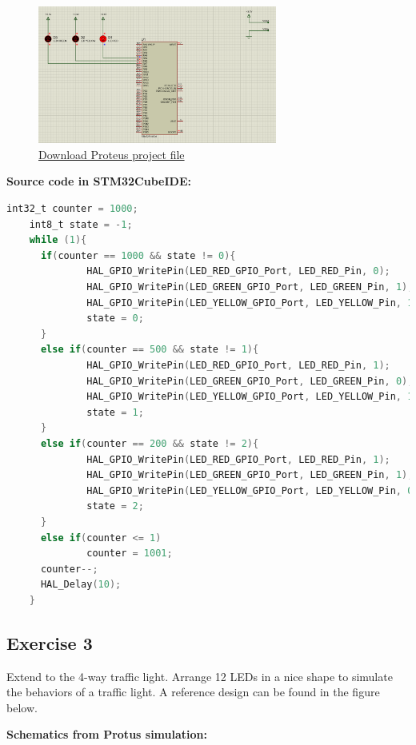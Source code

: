 \documentclass[twoside, final]{hcmut_report}
\begin{document}
\begin{figure}[ht]
    \centering
    \includegraphics[width=0.7\textwidth]{graphics/f3.png}
    \caption{
        \href{https://github.com/batmaon512/Microcontroller-251/blob/main/Lab/Lab1_LED_Animations/Source_Proteus/EX2.pdsprj}{Download Proteus project file}
    }

\end{figure}

\textbf{Source code in STM32CubeIDE:}
\begin{lstlisting}[language=C, caption=Source code for Exercise 2, label=lst:ex2]
    int32_t counter = 1000;
    int8_t state = -1;
    while (1){
      if(counter == 1000 && state != 0){
	  		  HAL_GPIO_WritePin(LED_RED_GPIO_Port, LED_RED_Pin, 0);
	  		  HAL_GPIO_WritePin(LED_GREEN_GPIO_Port, LED_GREEN_Pin, 1);
	  		  HAL_GPIO_WritePin(LED_YELLOW_GPIO_Port, LED_YELLOW_Pin, 1);
	  		  state = 0;
	  }
	  else if(counter == 500 && state != 1){
	  		  HAL_GPIO_WritePin(LED_RED_GPIO_Port, LED_RED_Pin, 1);
	  		  HAL_GPIO_WritePin(LED_GREEN_GPIO_Port, LED_GREEN_Pin, 0);
	  		  HAL_GPIO_WritePin(LED_YELLOW_GPIO_Port, LED_YELLOW_Pin, 1);
	  		  state = 1;
	  }
	  else if(counter == 200 && state != 2){
  		  	  HAL_GPIO_WritePin(LED_RED_GPIO_Port, LED_RED_Pin, 1);
  		  	  HAL_GPIO_WritePin(LED_GREEN_GPIO_Port, LED_GREEN_Pin, 1);
  		  	  HAL_GPIO_WritePin(LED_YELLOW_GPIO_Port, LED_YELLOW_Pin, 0);
  		  	  state = 2;
	  }
	  else if(counter <= 1)
	  		  counter = 1001;
	  counter--;
	  HAL_Delay(10);
    }
\end{lstlisting}
\subsection{Exercise 3}
Extend to the 4-way traffic light. Arrange 12 LEDs in a nice shape to simulate the behaviors of a traffic light. A reference design can be found in the figure below.

\textbf{Schematics from Protus simulation:}
\end{document}
